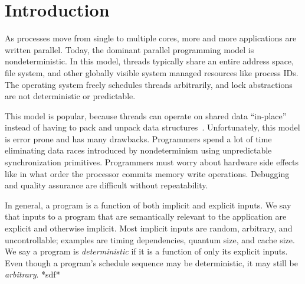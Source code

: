 
\section{Introduction}
As processes move from single to multiple cores, more and more applications are
written parallel. Today, the dominant parallel programming model is
nondeterministic. In this model, threads typically share an entire address
space, file system, and other globally visible system managed resources like
process IDs. The operating system freely schedules threads arbitrarily, and
lock abstractions are not deterministic or predictable.

This model is popular,
because threads can operate on shared data ``in-place'' instead of having to
pack and unpack data structures~\cite{Aviram10}. Unfortunately, this model is
error prone and has many drawbacks. Programmers spend a lot of time eliminating
data races introduced by nondeterminism using unpredictable synchronization
primitives. Programmers must worry about hardware side effects like in what
order the processor commits memory write operations. Debugging and quality
assurance are difficult without repeatability.

\iffalse
# The state of parallel programming and nondeterminism
* As processes move from single to multiple cores, more and more applications
  are written parallel.
* Today, the dominant parallel programming model is nondeterministic. In this
  model:
* Threads share address space, file system, and other globally visible
  resources and
* The OS is free to schedule threads arbitrarily and lock abstractions are not
  deterministic or predictable.
* This model is popular despite drawbacks:
* Data races and lock abstractions introduce bugs and deadlock,
* Programmers spend a lot of time eliminating nondeterminism (data races) using
  unpredictable synchronization primitives,
* Programmers must worry about hardware side effects like ordering of committing
  memory operations,
* Debugging and quality assurance are difficult without repeatability.
\fi

In general, a program is a function of both implicit and explicit inputs.
We say that inputs to a program that are semantically relevant to the
application are explicit and otherwise implicit. Most implicit inputs are
random, arbitrary, and uncontrollable; examples are timing dependencies, quantum
size, and cache size. We say a program is \emph{deterministic} if it is
a function of only its explicit inputs. Even though a program's schedule
sequence may be deterministic, it may still be \emph{arbitrary}. *sdf*

